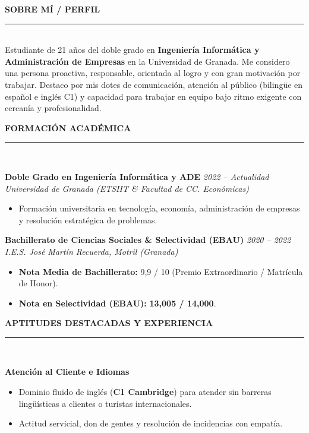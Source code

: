 \documentclass[10pt,a4paper]{article}
\begin{document}
\hfill
\begin{minipage}[t]{0.64\textwidth}
    \raggedright
    \color{primary}
    \textbf{\large SOBRE MÍ / PERFIL} \\
    \rule{\linewidth}{0.6pt} \\
    {\small \color{textcolor}
    Estudiante de 21 años del doble grado en \textbf{Ingeniería Informática y Administración de Empresas} en la Universidad de Granada. Me considero una persona proactiva, responsable, orientada al logro y con gran motivación por trabajar. Destaco por mis dotes de comunicación, atención al público (bilingüe en español e inglés C1) y capacidad para trabajar en equipo bajo ritmo exigente con cercanía y profesionalidad.
    }

    \vspace{12pt}
    \textbf{\large FORMACIÓN ACADÉMICA} \\
    \rule{\linewidth}{0.6pt} \\
    {\small
    \textbf{Doble Grado en Ingeniería Informática y ADE} \hfill \textit{2022 -- Actualidad} \\
    \textit{Universidad de Granada (ETSIIT \& Facultad de CC. Económicas)}
    \begin{itemize}[noitemsep,topsep=2pt,leftmargin=12pt]
        \item Formación universitaria en tecnología, economía, administración de empresas y resolución estratégica de problemas.
    \end{itemize}

    \vspace{4pt}
    \textbf{Bachillerato de Ciencias Sociales \& Selectividad (EBAU)} \hfill \textit{2020 -- 2022} \\
    \textit{I.E.S. José Martín Recuerda, Motril (Granada)}
    \begin{itemize}[noitemsep,topsep=2pt,leftmargin=12pt]
        \item \textbf{Nota Media de Bachillerato:} 9,9 / 10 (Premio Extraordinario / Matrícula de Honor).
        \item \textbf{Nota en Selectividad (EBAU):} \textbf{13,005 / 14,000}.
    \end{itemize}
    }

    \vspace{12pt}
    \textbf{\large APTITUDES DESTACADAS Y EXPERIENCIA} \\
    \rule{\linewidth}{0.6pt} \\
    {\small
    \textbf{Atención al Cliente e Idiomas}
    \begin{itemize}[noitemsep,topsep=2pt,leftmargin=12pt]
        \item Dominio fluido de inglés (\textbf{C1 Cambridge}) para atender sin barreras lingüísticas a clientes o turistas internacionales.
        \item Actitud servicial, don de gentes y resolución de incidencias con empatía.
    \end{itemize}

}
\end{minipage}
\end{document}
